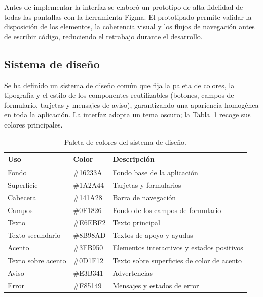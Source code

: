 \documentclass[12pt,a4paper,twoside,openright]{book}
\begin{document}
    Antes de implementar la interfaz se elaboró un prototipo de alta fidelidad
    de todas las pantallas con la herramienta Figma. El prototipado permite
    validar la disposición de los elementos, la coherencia visual y los flujos
    de navegación antes de escribir código, reduciendo el retrabajo durante el
    desarrollo.

    \subsection{Sistema de diseño}

    Se ha definido un sistema de diseño común que fija la paleta de colores, la
    tipografía y el estilo de los componentes reutilizables (botones, campos de
    formulario, tarjetas y mensajes de aviso), garantizando una apariencia
    homogénea en toda la aplicación. La interfaz adopta un tema oscuro; la
    Tabla~\ref{tab:paleta} recoge sus colores principales.

    \begin{table}[htbp]
        \centering
        \begin{tabular}{l l p{6.2cm}}
            \toprule
            \textbf{Uso} & \textbf{Color} & \textbf{Descripción} \\
            \midrule
            Fondo            & \#16233A & Fondo base de la aplicación \\
            Superficie       & \#1A2A44 & Tarjetas y formularios \\
            Cabecera         & \#141A28 & Barra de navegación \\
            Campos           & \#0F1826 & Fondo de los campos de formulario \\
            Texto            & \#E6EBF2 & Texto principal \\
            Texto secundario & \#8B98AD & Textos de apoyo y ayudas \\
            Acento           & \#3FB950 & Elementos interactivos y estados positivos \\
            Texto sobre acento & \#0D1F12 & Texto sobre superficies de color de acento \\
            Aviso            & \#E3B341 & Advertencias \\
            Error            & \#F85149 & Mensajes y estados de error \\
            \bottomrule
        \end{tabular}
        \caption{Paleta de colores del sistema de diseño.}
        \label{tab:paleta}
    \end{table}
\end{document}
